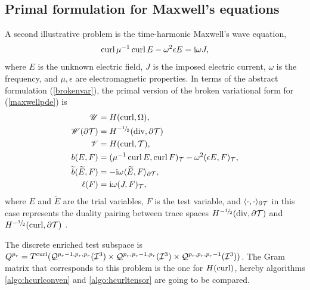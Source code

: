 \subsection{Primal formulation for Maxwell's equations}
% 
A second illustrative problem is the time-harmonic Maxwell's wave equation,
%
\begin{equation}
\operatorname{curl} \mu^{-1}\operatorname{curl} E - \omega^2\epsilon E=\mathrm{i}\omega J,
\label{maxwellpde}
\end{equation}
% 
where $E$ is the unknown electric field, $J$ is the imposed electric current, $\omega$ is the frequency, and $\mu,\epsilon$ are electromagnetic properties. In terms of the abstract formulation (\ref{brokenvar}), the primal version of the broken variational form for (\ref{maxwellpde}) is
\begin{equation}
\begin{aligned}
    \scU&=\HSo(\curl,\Omega),\\
    \scW(\partial\mesh)&=\HSo^{-\onehalf}(\div,\partial\mesh)\\
    \scV&=\HSo(\curl,\mesh),\\
    b(E,F)&=(\mu^{-1}\curl E,\curl F)_\mesh-\omega^2(\epsilon E,F)_\mesh,\\
    \tilde{b}(\tilde{E},F)&=-\zI\omega\langle\tilde{E},F\rangle_{\partial\mesh},\\
    \ell(F)&=\zI\omega(J,F)_\mesh,
\end{aligned}
\label{maxwellbrokenprimal}
\end{equation}
%
where $E$ and $\tilde{E}$ are the trial variables, $F$ is the test variable, and $\langle\cdot,\cdot \rangle_{\partial\mathcal{T}}$ in this case represents the duality pairing between trace spaces $\HSo^{-\onehalf}(\div,\partial\mesh)$ and $\HSo^{-\onehalf}(\curl,\partial\mesh)$ \cite{BrokenForms15}.

The discrete enriched test subspace is $Q^{p_r}=T^{\operatorname{curl}}(\mathcal{Q}^{p_r-1,p_r,p_r}(\mathcal{I}^3) \times\mathcal{Q}^{p_r,p_r-1,p_r}(\mathcal{I}^3) \times\mathcal{Q}^{p_r,p_r,p_r-1}(\mathcal{I}^3))$. The Gram matrix that corresponds to this problem is the one for $H(\operatorname{curl})$, hereby algorithms \ref{algo:hcurlconven} and \ref{algo:hcurltensor} are going to be compared.

